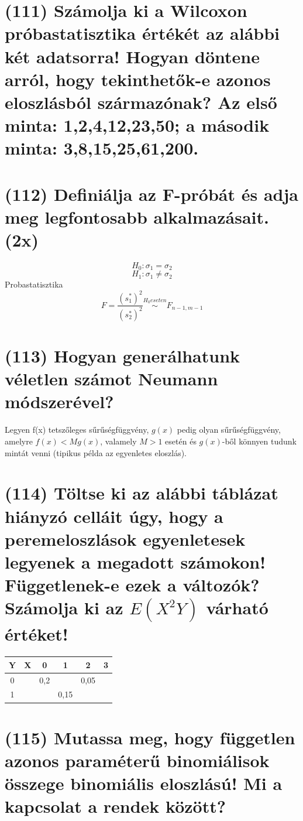 \documentclass[12p]{article}
\begin{document}
\section{(111) Számolja ki a Wilcoxon próbastatisztika értékét az alábbi két adatsorra! Hogyan döntene arról, hogy tekinthetők-e azonos eloszlásból származónak? Az első minta: 1,2,4,12,23,50;
a második minta: 3,8,15,25,61,200.}

\section{(112) Definiálja az F-próbát és adja meg legfontosabb alkalmazásait. (2x)}

$$H_0: \sigma_1 = \sigma_2$$
$$H_1: \sigma_1 \neq \sigma_2$$
Probastatisztika
$$F= \frac{(s_1^{*})^2}{(s_2^{*})^2} \stackrel{H_0 eseten}{\sim} F_{n-1,m-1}$$

\section{(113)  Hogyan generálhatunk véletlen számot Neumann módszerével?}

Legyen f(x) tetszőleges sűrűségfüggvény, $g(x)$ pedig olyan sűrűségfüggvény, amelyre $f(x) < Mg(x)$, valamely $M>1$ esetén és $g(x)$-ből könnyen tudunk mintát venni (tipikus példa az egyenletes eloszlás).

\section{(114) Töltse ki az alábbi táblázat hiányzó celláit úgy, hogy a peremeloszlások egyenletesek
legyenek a megadott számokon! Függetlenek-e ezek a változók? Számolja ki az $E(X^2Y)$ várható értéket!}

\begin{center}
 \begin{tabular}{| c c || c | c | c | c |} 
 \hline
 Y & X &  0 & 1 & 2 & 3\\ [0.5ex] 
 \hline\hline
 0 &  & 0,2 & & 0,05 & \\ 
 \hline
 1 &  & & 0,15 & & \\
 \hline\hline
\end{tabular}
\end{center}

\section{(115) Mutassa meg, hogy független azonos paraméterű binomiálisok összege binomiális eloszlású! Mi a kapcsolat a rendek között?}
\end{document}

